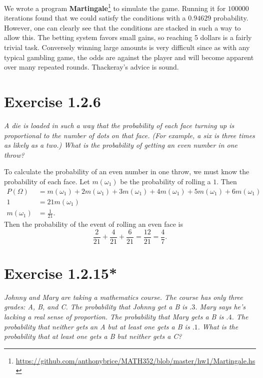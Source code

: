\documentclass{tufte-handout}
\begin{document}
We wrote a program \textbf{Martingale}\footnote{
  \url{https://github.com/anthonybrice/MATH352/blob/master/hw1/Martingale.hs}}
to simulate the game. Running it for $100000$ iterations found that we
could satisfy the conditions with a $0.94629$ probability. However,
one can clearly see that the conditions are stacked in such a way to
allow this. The betting system favors small gains, so reaching 5
dollars is a fairly trivial task. Conversely winning large amounts is
very difficult since as with any typical gambling game, the odds are
against the player and will become apparent over many repeated
rounds. Thackeray's advice is sound.

\section{Exercise 1.2.6}

\begin{description}
\item \textit{A die is loaded in such a way that the probability of
    each face turning up is proportional to the number of dots on that
    face. (For example, a six is three times as likely as a two.) What
    is the probability of getting an even number in one throw?}
\end{description}

To calculate the probability of an even number in one throw, we must
know the probability of each face. Let $m(\omega_1)$ be the probability of
rolling a $1$. Then
\begin{align*}
  P(\Omega) &= m(\omega_1) + 2m(\omega_1) + 3m(\omega_1) + 4m(\omega_1) +
  5m(\omega_1) + 6m(\omega_1)\\
  1 &= 21m(\omega_1)\\
  m(\omega_1) &= \frac{1}{21}.
\end{align*}
Then the probability of the event of rolling an even face is
\[\frac{2}{21} + \frac{4}{21} + \frac{6}{21} = \frac{12}{21} =
\frac{4}{7}.\]

\section{Exercise 1.2.15*}

\begin{description}
\item \textit{Johnny and Mary are taking a mathematics course. The course has
    only three grades: A, B, and C. The probability that Johnny get a
    B is $.3$. Mary says he's lacking a real sense of proportion. The
    probability that Mary gets a B is $.4$. The probability that
    neither gets an A but at least one gets a B is $.1$. What is the
    probability that at least one gets a B but neither gets a C?}
\end{description}
\end{document}
